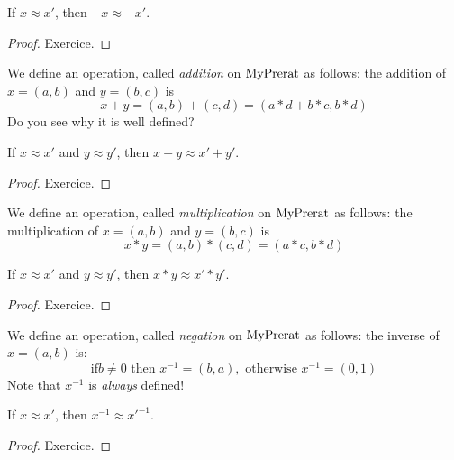 \begin{lemma}
    \label{MyPrerat.neg_quotient}
    \leanok
If $x \approx x'$, then $-x \approx -x'$.
\end{lemma}
\begin{proof}
\leanok
Exercice.
\end{proof}

\begin{definition}
    \label{MyPrerat.add}
    \leanok
We define an operation, called \emph{addition} on $\mathrm{MyPrerat}$ as follows: the addition of $x = (a,b)$
and $y = (b, c)$ is
\[
x + y = (a,b) + (c,d) = (a * d + b * c, b*d)
\]
Do you see why it is well defined?
\end{definition}

\begin{lemma}
    \label{MyPrerat.add_quotient}
    \leanok
If $x \approx x'$ and $y \approx y'$, then $x + y \approx x' + y'$.
\end{lemma}
\begin{proof}
\leanok
Exercice.
\end{proof}

\begin{definition}
    \label{MyPrerat.mul}
    \leanok
We define an operation, called \emph{multiplication} on $\mathrm{MyPrerat}$ as follows: the multiplication of $x = (a,b)$ and $y = (b, c)$ is
\[
x * y = (a,b) * (c,d) = (a*c, b*d)
\]
\end{definition}

\begin{lemma}
    \label{MyPrerat.mul_quotient}
    \leanok
If $x \approx x'$ and $y \approx y'$, then $x * y \approx x' * y'$.
\end{lemma}
\begin{proof}
\leanok
Exercice.
\end{proof}

\begin{definition}
    \label{MyPrerat.inv}
    \leanok
We define an operation, called \emph{negation} on $\mathrm{MyPrerat}$ as follows: the inverse of $x = (a,b)$ is:
\[
\mbox{if} b \neq 0 \mbox{ then } x^{-1} = (b, a), \mbox{ otherwise } x^{-1} = (0, 1)
\]
Note that $x^{-1}$ is \emph{always} defined!
\end{definition}

\begin{lemma}
    \label{MyPrerat.inv_quotient}
    \leanok
If $x \approx x'$, then $x^{-1} \approx x'^{-1}$.
\end{lemma}
\begin{proof}
\leanok
Exercice.
\end{proof}